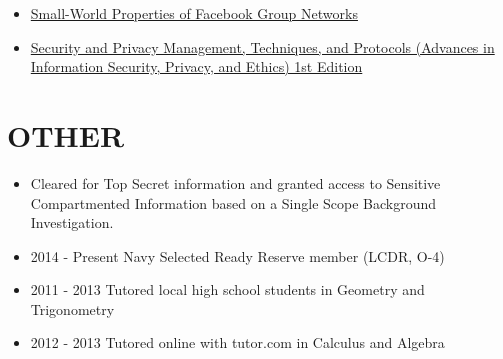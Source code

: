 \documentclass[10pt]{article}
\def\tightlist{}
\begin{document}
\begin{itemize}
\tightlist
\item
  \href{http://wpmedia.wolfram.com/uploads/sites/13/2018/02/23-3-1.pdf}{Small-World
  Properties of Facebook Group Networks}
\item
  \href{https://smile.amazon.com/gp/product/1522555838/ref=ppx_yo_dt_b_asin_title_o02_s00?ie=UTF8\&psc=1}{Security
  and Privacy Management, Techniques, and Protocols (Advances in
  Information Security, Privacy, and Ethics) 1st Edition}
\end{itemize}

\hypertarget{other}{%
\section{OTHER}\label{other}}

\begin{itemize}
\tightlist
\item
  Cleared for Top Secret information and granted access to Sensitive
  Compartmented Information based on a Single Scope Background
  Investigation.
\item
  2014 - Present Navy Selected Ready Reserve member (LCDR, O-4)
\item
  2011 - 2013 Tutored local high school students in Geometry and
  Trigonometry
\item
  2012 - 2013 Tutored online with tutor.com in Calculus and Algebra
\end{itemize}

\end{document}
